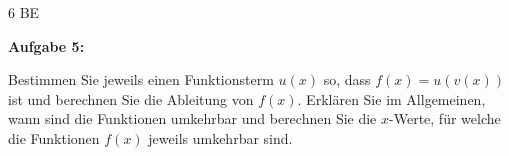 \documentclass[a4paper,12pt]{article}
\newcommand{\Aufgabe}[1]{
  {
  \vspace*{0.5cm}
  \textsf{\textbf{Aufgabe #1}}
  \vspace*{0.2cm}
  
  }
}
\begin{document}
\begin{figure}[H]
  \centering

\end{figure}

\begin{flushright}6 BE \end{flushright}
\newpage





\Aufgabe {5:} 

Bestimmen Sie jeweils einen Funktionsterm $u(x)$ so, dass $f(x)=u(v(x))$ ist und berechnen Sie die Ableitung von $f(x)$. Erklären Sie im Allgemeinen, wann sind die Funktionen umkehrbar und berechnen Sie die $x$-Werte, für welche die Funktionen $f(x)$  jeweils umkehrbar sind. 
\end{document}
